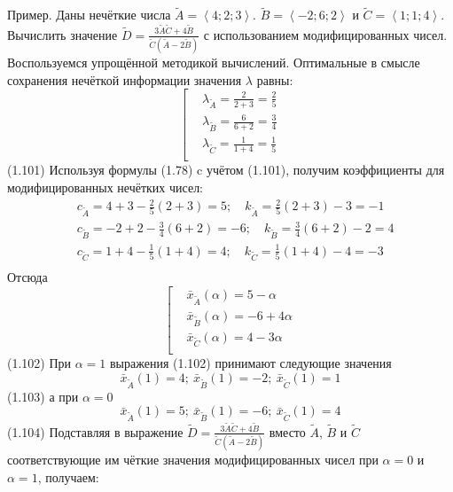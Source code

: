 Пример. Даны нечёткие числа $\tilde{A}=\left\langle 4;2;3 \right\rangle $. $\tilde{B}=\left\langle -2;6;2 \right\rangle $ и $\tilde{C}=\left\langle 1;1;4 \right\rangle $. Вычислить значение $\tilde{D}=\frac{3\tilde{A}\tilde{C}+4\tilde{B}}{\tilde{C}\left( \tilde{A}-2\tilde{B} \right)}$ с использованием модифицированных чисел.
Воспользуемся упрощённой методикой вычислений. Оптимальные в смысле сохранения нечёткой информации значения $\lambda$ равны:
	\[\left[ \begin{aligned}
  & {{\lambda }_{{\tilde{A}}}}=\frac{2}{2+3}=\frac{2}{5} \\ 
 & {{\lambda }_{{\tilde{B}}}}=\frac{6}{6+2}=\frac{3}{4} \\ 
 & {{\lambda }_{{\tilde{C}}}}=\frac{1}{1+4}=\frac{1}{5} \\ 
\end{aligned} \right.\] 	(1.101)
Используя формулы (1.78) c учётом (1.101), получим коэффициенты для модифицированных нечётких чисел:
	\[\begin{aligned}
  & {{c}_{{\tilde{A}}}}=4+3-\frac{2}{5}\left( 2+3 \right)=5;\quad {{k}_{{\tilde{A}}}}=\frac{2}{5}\left( 2+3 \right)-3=-1 \\ 
 & {{c}_{{\tilde{B}}}}=-2+2-\frac{3}{4}\left( 6+2 \right)=-6;\quad {{k}_{{\tilde{B}}}}=\frac{3}{4}\left( 6+2 \right)-2=4 \\ 
 & {{c}_{{\tilde{C}}}}=1+4-\frac{1}{5}\left( 1+4 \right)=4;\quad {{k}_{{\tilde{C}}}}=\frac{1}{5}\left( 1+4 \right)-4=-3 \\ 
\end{aligned}\] 
Отсюда
	\[\left[ \begin{aligned}
  & {{{\bar{x}}}_{{\tilde{A}}}}\left( \alpha  \right)=5-\alpha  \\ 
 & {{{\bar{x}}}_{{\tilde{B}}}}\left( \alpha  \right)=-6+4\alpha  \\ 
 & {{{\bar{x}}}_{{\tilde{C}}}}\left( \alpha  \right)=4-3\alpha  \\ 
\end{aligned} \right.\] 	(1.102)
При $\alpha=1$ выражения (1.102) принимают следующие значения
	\[{{\bar{x}}_{{\tilde{A}}}}\left( 1 \right)=4;\ {{\bar{x}}_{{\tilde{B}}}}\left( 1 \right)=-2;\ {{\bar{x}}_{{\tilde{C}}}}\left( 1 \right)=1\] 	(1.103)
а при $\alpha=0$
	\[{{\bar{x}}_{{\tilde{A}}}}\left( 1 \right)=5;\ {{\bar{x}}_{{\tilde{B}}}}\left( 1 \right)=-6;\ {{\bar{x}}_{{\tilde{C}}}}\left( 1 \right)=4\] 	(1.104)
Подставляя в выражение $\tilde{D}=\frac{3\tilde{A}\tilde{C}+4\tilde{B}}{\tilde{C}\left( \tilde{A}-2\tilde{B} \right)}$ вместо $\tilde A$, $\tilde B$ и $\tilde C$ соответствующие им чёткие значения модифицированных чисел при $\alpha=0$ и $\alpha=1$, получаем:
